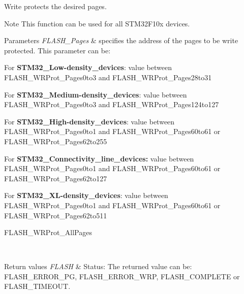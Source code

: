Write protects the desired pages. 

\begin{DoxyNote}{Note}
This function can be used for all S\+T\+M32\+F10x devices. 
\end{DoxyNote}

\begin{DoxyParams}{Parameters}
{\em F\+L\+A\+S\+H\+\_\+\+Pages} & specifies the address of the pages to be write protected. This parameter can be\+: \begin{DoxyItemize}
\item For {\bfseries S\+T\+M32\+\_\+\+Low-\/density\+\_\+devices}\+: value between F\+L\+A\+S\+H\+\_\+\+W\+R\+Prot\+\_\+\+Pages0to3 and F\+L\+A\+S\+H\+\_\+\+W\+R\+Prot\+\_\+\+Pages28to31 \item For {\bfseries S\+T\+M32\+\_\+\+Medium-\/density\+\_\+devices}\+: value between F\+L\+A\+S\+H\+\_\+\+W\+R\+Prot\+\_\+\+Pages0to3 and F\+L\+A\+S\+H\+\_\+\+W\+R\+Prot\+\_\+\+Pages124to127 \item For {\bfseries S\+T\+M32\+\_\+\+High-\/density\+\_\+devices}\+: value between F\+L\+A\+S\+H\+\_\+\+W\+R\+Prot\+\_\+\+Pages0to1 and F\+L\+A\+S\+H\+\_\+\+W\+R\+Prot\+\_\+\+Pages60to61 or F\+L\+A\+S\+H\+\_\+\+W\+R\+Prot\+\_\+\+Pages62to255 \item For {\bfseries S\+T\+M32\+\_\+\+Connectivity\+\_\+line\+\_\+devices\+:} value between F\+L\+A\+S\+H\+\_\+\+W\+R\+Prot\+\_\+\+Pages0to1 and F\+L\+A\+S\+H\+\_\+\+W\+R\+Prot\+\_\+\+Pages60to61 or F\+L\+A\+S\+H\+\_\+\+W\+R\+Prot\+\_\+\+Pages62to127 \item For {\bfseries S\+T\+M32\+\_\+\+X\+L-\/density\+\_\+devices}\+: value between F\+L\+A\+S\+H\+\_\+\+W\+R\+Prot\+\_\+\+Pages0to1 and F\+L\+A\+S\+H\+\_\+\+W\+R\+Prot\+\_\+\+Pages60to61 or F\+L\+A\+S\+H\+\_\+\+W\+R\+Prot\+\_\+\+Pages62to511 \item F\+L\+A\+S\+H\+\_\+\+W\+R\+Prot\+\_\+\+All\+Pages \end{DoxyItemize}
\\
\hline
\end{DoxyParams}

\begin{DoxyRetVals}{Return values}
{\em F\+L\+A\+SH} & Status\+: The returned value can be\+: F\+L\+A\+S\+H\+\_\+\+E\+R\+R\+O\+R\+\_\+\+PG, F\+L\+A\+S\+H\+\_\+\+E\+R\+R\+O\+R\+\_\+\+W\+RP, F\+L\+A\+S\+H\+\_\+\+C\+O\+M\+P\+L\+E\+TE or F\+L\+A\+S\+H\+\_\+\+T\+I\+M\+E\+O\+UT. \\
\hline
\end{DoxyRetVals}


